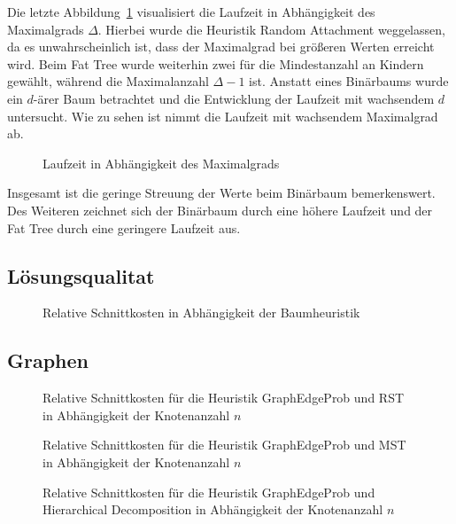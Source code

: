 Die letzte Abbildung~\ref{fig:rundeg} visualisiert die Laufzeit in Abhängigkeit des Maximalgrads $\Delta$.
Hierbei wurde die Heuristik Random Attachment weggelassen, da es unwahrscheinlich ist, dass der Maximalgrad bei größeren Werten erreicht wird.
Beim Fat Tree wurde weiterhin zwei für die Mindestanzahl an Kindern gewählt, während die Maximalanzahl $\Delta - 1$ ist.
Anstatt eines Binärbaums wurde ein $d$\hyp ärer Baum betrachtet und die Entwicklung der Laufzeit mit wachsendem $d$ untersucht.
Wie zu sehen ist nimmt die Laufzeit mit wachsendem Maximalgrad ab.
\begin{figure}
    \centering
    
    \caption{Laufzeit in Abhängigkeit des Maximalgrads\label{fig:rundeg}}
\end{figure}

Insgesamt ist die geringe Streuung der Werte beim Binärbaum bemerkenswert.
Des Weiteren zeichnet sich der Binärbaum durch eine höhere Laufzeit und der Fat Tree durch eine geringere Laufzeit aus.

\subsection{Lösungsqualitat}

\begin{figure}
    \centering
    
    \caption{Relative Schnittkosten in Abhängigkeit der Baumheuristik\label{fig:treecutcost}}
\end{figure}

\subsection{Graphen}

\begin{figure}
    \centering
    
    \caption{Relative Schnittkosten für die Heuristik GraphEdgeProb und RST in Abhängigkeit der Knotenanzahl $n$}
\end{figure}

\begin{figure}
    \centering
    
    \caption{Relative Schnittkosten für die Heuristik GraphEdgeProb und MST in Abhängigkeit der Knotenanzahl $n$}
\end{figure}

\begin{figure}
    \centering
    
    \caption{Relative Schnittkosten für die Heuristik GraphEdgeProb und Hierarchical Decomposition in Abhängigkeit der Knotenanzahl $n$}
\end{figure}


